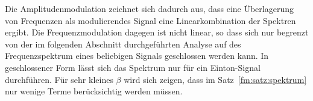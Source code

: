 
Die Amplitudenmodulation zeichnet sich dadurch aus, dass eine
Überlagerung von Frequenzen als modulierendes Signal eine Linearkombination
der Spektren ergibt.
Die Frequenzmodulation dagegen ist nicht linear, so dass sich nur
begrenzt von der im folgenden Abschnitt durchgeführten Analyse
auf des Frequenzspektrum eines beliebigen Signals geschlossen
werden kann.
In geschlossener Form lässt sich das Spektrum nur für ein Einton-Signal
durchführen.
Für sehr kleines $\beta$ wird sich zeigen, dass im Satz~\ref{fm:satz:spektrum}
nur wenige Terme berücksichtig werden müssen.


